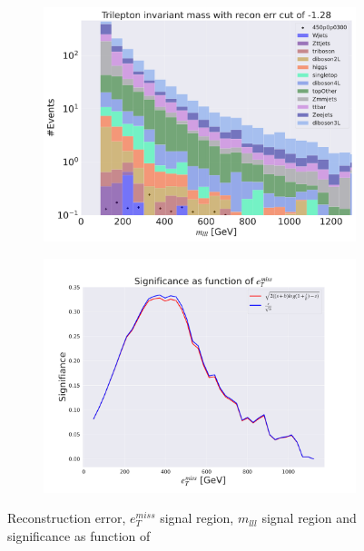 \begin{figure}[H]
    \hfill
    \begin{subfigure}{.40\textwidth}
        \includegraphics[width=\textwidth]{Figures/AE_testing/small/3lep/b_data_recon_big_rm3_feats_sig_450p0p0300_mlll_recon_errcut_-1.28.pdf}
        \caption{}
        \label{fig:AE_3lep_small_mlll_450_2}
    \end{subfigure}
    \hfill   
    \begin{subfigure}{.40\textwidth}
        \includegraphics[width=\textwidth]{Figures/AE_testing/small/3lep/significance_etmiss_450p0p0300_-1.2800970222462997.pdf}
        \caption{}
        \label{fig:AE_3lep_small_signi_450_2}
    \end{subfigure}
    \hfill      
    \caption[3lep shallow network | $450p300$ | AE | 2]{Reconstruction error, $e_T^{miss}$ signal region, $m_{lll}$ signal region and significance as function of 
}
\end{figure}
